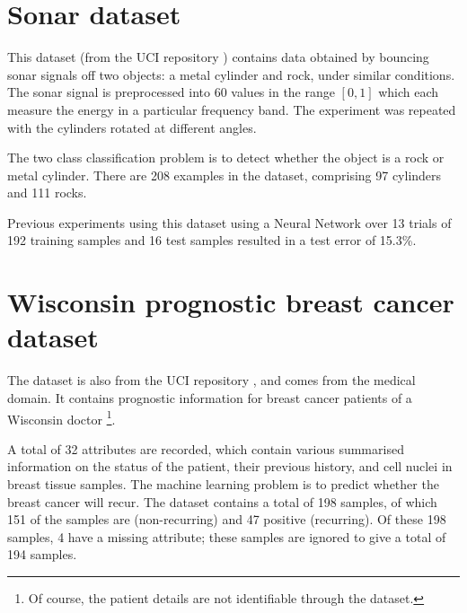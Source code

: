 \section{Sonar dataset}

This dataset (from the UCI repository \cite{UCI}) contains data
obtained by bouncing sonar signals off two objects: a metal cylinder
and rock, under similar conditions.  The sonar signal is preprocessed
into 60 values in the range $[0,1]$ which each measure the energy in a
particular frequency band.  The experiment was repeated with the
cylinders rotated at different angles.

The two class classification problem is to detect whether the object
is a rock or metal cylinder.  There are 208 examples in the dataset,
comprising 97 cylinders and 111 rocks.

Previous experiments using this dataset \cite{Gorman88} using a Neural
Network over 13 trials of 192 training samples and 16 test samples
resulted in a test error of 15.3\%.


\section{Wisconsin prognostic breast cancer dataset}

The  dataset is also from the UCI repository \cite{UCI}, and
comes from the medical domain.  It contains prognostic information for
breast cancer patients of a Wisconsin doctor%
\footnote{Of course, the patient details are not identifiable through
the dataset.}.

A total of 32 attributes are recorded, which contain various
summarised information on the status of the patient, their previous
history, and cell nuclei in breast tissue samples.  The machine
learning problem is to predict whether the breast cancer will recur.
The dataset contains a total of 198 samples, of which 151 of the
samples are (non-recurring) and 47 positive (recurring).  Of these 198
samples, 4 have a missing attribute; these samples are ignored to give
a total of 194 samples.
